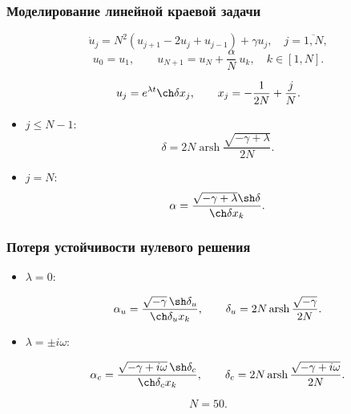 \documentclass[fullscreen=true, unicode, bookmarks=false]{beamer}
\DeclareMathOperator{\arsh}{arsh}
\begin{document}
\begin{frame}
\frametitle{ Моделирование линейной краевой задачи }

$$ \dot{u}_j =  N^2(u_{j+1} - 2u_j + u_{j-1}) + \gamma u_j, \quad j = \overline{1, N}, $$
$$ u_0 = u_1, \qquad u_{N+1} = u_N + \frac{\alpha}{N}\:u_k, \quad k \in [1,N]. $$

\vfill
 
$$ u_j = e^{\lambda t} \ch \delta x_j, \qquad x_j = -\dfrac{1}{2N} + \dfrac{j}{N}. $$

\vfill

\begin{itemize}

\item { $ j \leqslant N-1: $ 
}
$$
\delta = 2N \arsh \dfrac{\sqrt{-\gamma+\lambda}}{2N}.
$$
\item { $ j = N: $ 
}
$$
\alpha = \dfrac{\sqrt{-\gamma+\lambda}\sh\delta}{\ch\delta x_k}.
$$

\end{itemize}

\end{frame}

\begin{frame}
\frametitle{ Потеря устойчивости нулевого решения }

\begin{itemize}

\item { $ \lambda = 0: $ 
}

$$ \alpha_u = \frac{ \sqrt{-\gamma} \, \sh \delta_u }{ \ch\delta_u x_k }, \qquad \delta_u = 2N \arsh \dfrac{\sqrt{-\gamma}}{2N}. $$

\medskip

\item { $ \lambda = \pm i \omega: \; $ 
}

$$ \alpha_c = \frac{ \sqrt{-\gamma + i \omega} \, \sh \delta_c }{ \ch\delta_c x_k }, \qquad \delta_c = 2N \arsh \dfrac{\sqrt{-\gamma + i \omega}}{2N}. $$

\end{itemize}

\bigskip

$$ N = 50. $$	

\end{frame}
\end{document}
